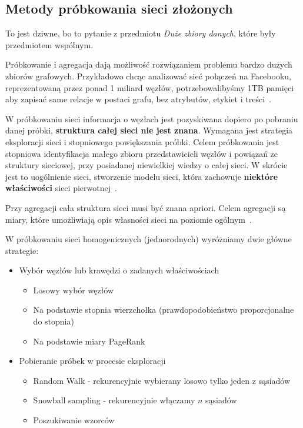 \documentclass[wi]{zut}
\begin{document}

\subsection{Metody próbkowania sieci złożonych}

To jest dziwne, bo to pytanie z przedmiotu \emph{Duże zbiory danych}, które były przedmiotem wspólnym.

Próbkowanie i agregacja dają możliwość rozwiązaniem problemu bardzo dużych zbiorów grafowych. Przykładowo chcąc analizować sieć połączeń na Facebooku, reprezentowaną przez ponad 1 miliard węzłów, potrzebowalibyśmy 1TB pamięci aby zapisać same relacje w postaci grafu, bez atrybutów, etykiet i treści~\cite{Jankowski2020_probkowanie}. 

W próbkowaniu sieci informacja o węzłach jest pozyskiwana dopiero po pobraniu danej próbki, \textbf{struktura całej sieci nie jest znana}. Wymagana jest strategia eksploracji sieci i stopniowego powiększania próbki. Celem próbkowania jest stopniowa identyfikacja małego zbioru przedstawicieli węzłów i powiązań ze struktury sieciowej, przy posiadanej niewielkiej wiedzy o całej sieci. W skrócie jest to uogólnienie sieci, stworzenie modelu sieci, która zachowuje \textbf{niektóre właściwości} sieci pierwotnej~\cite{Jankowski2020_probkowanie}. 

Przy agregacji cała struktura sieci musi być znana apriori. Celem agregacji są miary, które umożliwiają opis własności sieci na poziomie ogólnym~\cite{Jankowski2020_probkowanie}. 

W próbkowaniu sieci homogenicznych (jednorodnych) wyróżniamy dwie główne strategie:

\begin{itemize}
    \item Wybór węzłów lub krawędzi o zadanych właściwościach
    \begin{itemize}
        \item Losowy wybór węzłów
        \item Na podstawie stopnia wierzchołka (prawdopodobieństwo proporcjonalne do stopnia)
        \item Na podstawie miary PageRank
    \end{itemize}
    \item Pobieranie próbek w procesie eksploracji
    \begin{itemize}
        \item Random Walk - rekurencyjnie wybierany losowo tylko jeden z sąsiadów
        \item Snowball sampling - rekurencyjnie włączamy $n$ sąsiadów
        \item Poszukiwanie wzorców
    \end{itemize}
\end{itemize}
\end{document}
